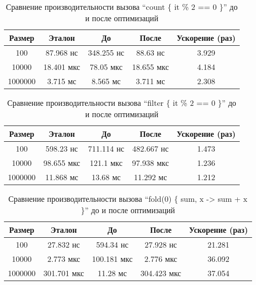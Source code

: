 \begin{table}[h]
\begin{center}
\begin{tabular}{|c|c|c|c|c|} \hline
Размер & Эталон & До & После & Ускорение (раз) \\ \hline
100 & 87.968 нс & 348.255 нс & 88.63 нс & 3.929\\ \hline
10000 & 18.401 мкс & 78.05 мкс & 18.655 мкс & 4.184\\ \hline
1000000 & 3.715 мс & 8.565 мс & 3.711 мс & 2.308\\ \hline
\end{tabular}
\caption{Сравнение производительности вызова ``count \{ it \% 2 == 0 \}'' до и после оптимизаций}
\label{bm:count:opt}
\end{center}
\end{table}

\begin{table}[h]
\begin{center}
\begin{tabular}{|c|c|c|c|c|} \hline
Размер & Эталон & До & После & Ускорение (раз) \\ \hline
100 & 598.23 нс & 711.114 нс & 482.667 нс & 1.473\\ \hline
10000 & 98.655 мкс & 121.1 мкс & 97.938 мкс & 1.236\\ \hline
1000000 & 11.868 мс & 13.68 мс & 11.292 мс & 1.212\\ \hline
\end{tabular}
\caption{Сравнение производительности вызова ``filter \{ it \% 2 == 0 \}'' до и после оптимизаций}
\label{bm:filter:opt}
\end{center}
\end{table}

\begin{table}[h]
\begin{center}
\begin{tabular}{|c|c|c|c|c|} \hline
Размер & Эталон & До & После & Ускорение (раз) \\ \hline
100 & 27.832 нс & 594.34 нс & 27.928 нс & 21.281\\ \hline
10000 & 2.773 мкс & 100.181 мкс & 2.776 мкс & 36.092\\ \hline
1000000 & 301.701 мкс & 11.28 мс & 304.423 мкс & 37.054\\ \hline
\end{tabular}
\caption{Сравнение производительности вызова ``fold(0) \{ sum, x -> sum + x \}'' до и после оптимизаций}
\label{bm:fold:opt}
\end{center}
\end{table}

